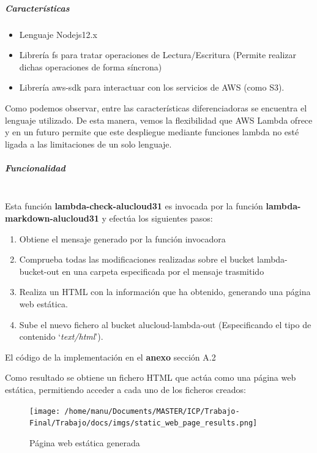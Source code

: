 \documentclass[
]{article}
\begin{document}
\hypertarget{header-n68}{%
\subparagraph{Características}\label{header-n68}}

\begin{itemize}
\item
  Lenguaje Nodejs12.x
\item
  Librería fs para tratar operaciones de Lectura/Escritura (Permite
  realizar dichas operaciones de forma síncrona)
\item
  Librería aws-sdk para interactuar con los servicios de AWS (como S3).
\end{itemize}

Como podemos observar, entre las características diferenciadoras se
encuentra el lenguaje utilizado. De esta manera, vemos la flexibilidad
que AWS Lambda ofrece y en un futuro permite que este despliegue
mediante funciones lambda no esté ligada a las limitaciones de un solo
lenguaje.

\hypertarget{header-n77}{%
\subparagraph{Funcionalidad}\label{header-n77}}
\leavevmode
\newline
\\
Esta función \textbf{lambda-check-alucloud31} es invocada por la función
\textbf{lambda-markdown-alucloud31} y efectúa los siguientes pasos:

\begin{enumerate}
\def\labelenumi{\arabic{enumi}.}
\item
  Obtiene el mensaje generado por la función invocadora
\item
  Comprueba todas las modificaciones realizadas sobre el bucket
  lambda-bucket-out en una carpeta especificada por el mensaje
  trasmitido
\item
  Realiza un HTML con la información que ha obtenido, generando una
  página web estática.
\item
  Sube el nuevo fichero al bucket alucloud-lambda-out (Especificando el
  tipo de contenido `\emph{text/html}').
\end{enumerate}

El código de la implementación en el \textbf{anexo} sección A.2

Como resultado se obtiene un fichero HTML que actúa como una página web
estática, permitiendo acceder a cada uno de los ficheros creados:

\begin{figure}[H]
\centering
\texttt{[image: /home/manu/Documents/MASTER/ICP/Trabajo-Final/Trabajo/docs/imgs/static\_web\_page\_results.png]}
\caption{Página web estática generada}
\end{figure}
\end{document}
